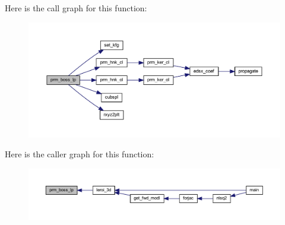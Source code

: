Here is the call graph for this function\+:\nopagebreak
\begin{figure}[H]
\begin{center}
\leavevmode
\includegraphics[width=350pt]{Leroi_8f90_ae4548433d1a40c9ae5dce4d7404c9404_cgraph}
\end{center}
\end{figure}
Here is the caller graph for this function\+:\nopagebreak
\begin{figure}[H]
\begin{center}
\leavevmode
\includegraphics[width=350pt]{Leroi_8f90_ae4548433d1a40c9ae5dce4d7404c9404_icgraph}
\end{center}
\end{figure}
\mbox{\label{Leroi_8f90_ac15aa4c46264754ea7abffbe2ea1926c}} 
